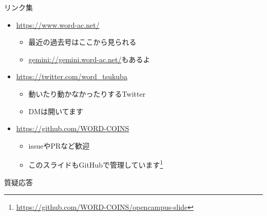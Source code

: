 \documentclass[lualatex]{beamer}
\begin{document}
\begin{frame}[plain]{リンク集}
 \begin{itemize}
  \item \url{https://www.word-ac.net/}
  \begin{itemize}
   \item 最近の過去号はここから見られる
   \item \url{gemini://gemini.word-ac.net/}もあるよ
  \end{itemize}
  \item \url{https://twitter.com/word\_tsukuba}
  \begin{itemize}
   \item 動いたり動かなかったりするTwitter
   \item DMは開いてます
  \end{itemize}
  \item \url{https://github.com/WORD-COINS}
  \begin{itemize}
   \item issueやPRなど歓迎
   \item このスライドもGitHubで管理しています\footnote{\url{https://github.com/WORD-COINS/opencampus-slide}}
  \end{itemize}
 \end{itemize}
\end{frame}
\begin{frame}[plain]
 \begin{center}
  質疑応答
 \end{center}
\end{frame}
\end{document}
